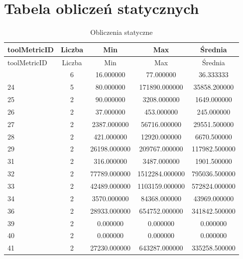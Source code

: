 \documentclass[a4paper,12pt]{article}
\begin{document}
\section{Tabela obliczeń statycznych}
\begin{center}
\small
\begin{longtable}{l S[table-format=3.0] S[table-format=8.2] S[table-format=8.2] S[table-format=8.2]}
\caption{Obliczenia statyczne} \label{tab:tool_metrics_full} \\
\toprule
{toolMetricID} & {Liczba} & {Min} & {Max} & {Średnia} \\
\midrule
\endfirsthead

\toprule
{toolMetricID} & {Liczba} & {Min} & {Max} & {Średnia} \\
\midrule
\endhead

\bottomrule
{}   &   6   &    16.000000   &      77.000000    &      36.333333 \\
          24   &   5   &    80.000000   &   171890.000000    &     35858.200000 \\
          25   &   2   &    90.000000   &    3208.000000    &      1649.000000 \\
          26   &   2   &    37.000000   &     453.000000    &       245.000000 \\
          27   &   2   &  2387.000000   &    56716.000000    &     29551.500000 \\
          28   &   2   &   421.000000   &    12920.000000    &      6670.500000 \\
          29   &   2   & 26198.000000   &   209767.000000    &    117982.500000 \\
          31   &   2   &   316.000000   &    3487.000000    &      1901.500000 \\
          32   &   2   & 77789.000000   &  1512284.000000    &    795036.500000 \\
          33   &   2   & 42489.000000   &  1103159.000000    &    572824.000000 \\
          34   &   2   &  3570.000000   &    84368.000000    &     43969.000000 \\
          36   &   2   & 28933.000000   &   654752.000000    &    341842.500000 \\
          39   &   2   &    0.000000    &      0.000000     &       0.000000 \\
          40   &   2   &    0.000000    &      0.000000     &       0.000000 \\
          41   &   2   & 27230.000000   &   643287.000000    &    335258.500000 \\

\end{longtable}
\end{center}
\end{document}
